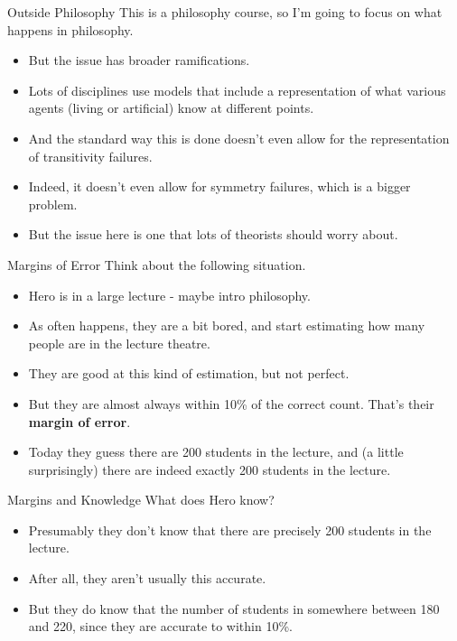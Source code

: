 \documentclass[
  14pt,
  letterpaper,
  ignorenonframetext,
  handout]{beamer}
\providecommand{\tightlist}{%
  \setlength{\itemsep}{0pt}\setlength{\parskip}{0pt}}\usepackage{longtable,booktabs,array}
\begin{document}
\begin{frame}{Outside Philosophy}
\protect\hypertarget{outside-philosophy}{}
This is a philosophy course, so I'm going to focus on what happens in
philosophy.

\begin{itemize}
\tightlist
\item
  But the issue has broader ramifications.
\item
  Lots of disciplines use models that include a representation of what
  various agents (living or artificial) know at different points.
\item
  And the standard way this is done doesn't even allow for the
  representation of transitivity failures.
\item
  Indeed, it doesn't even allow for symmetry failures, which is a bigger
  problem.
\item
  But the issue here is one that lots of theorists should worry about.
\end{itemize}
\end{frame}

\begin{frame}{Margins of Error}
\protect\hypertarget{margins-of-error}{}
Think about the following situation.

\begin{itemize}
\tightlist
\item
  Hero is in a large lecture - maybe intro philosophy.
\item
  As often happens, they are a bit bored, and start estimating how many
  people are in the lecture theatre.
\item
  They are good at this kind of estimation, but not perfect.
\item
  But they are almost always within 10\% of the correct count. That's
  their \textbf{margin of error}.
\item
  Today they guess there are 200 students in the lecture, and (a little
  surprisingly) there are indeed exactly 200 students in the lecture.
\end{itemize}
\end{frame}

\begin{frame}{Margins and Knowledge}
\protect\hypertarget{margins-and-knowledge}{}
What does Hero know?

\begin{itemize}
\tightlist
\item
  Presumably they don't know that there are precisely 200 students in
  the lecture.
\item
  After all, they aren't usually this accurate.
\item
  But they do know that the number of students in somewhere between 180
  and 220, since they are accurate to within 10\%.
\end{itemize}
\end{frame}
\end{document}
